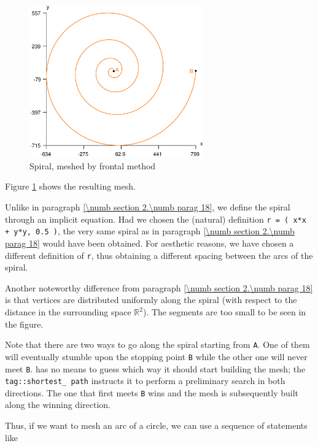 \begin{figure} \centering
 \includegraphics[width=75mm]{spiral-prog}
  \caption{Spiral, meshed by frontal method}
 \label{\numb section 3.\numb fig 3}
\end{figure}

Figure \ref{\numb section 3.\numb fig 3} shows the resulting mesh.

Unlike in paragraph \ref{\numb section 2.\numb parag 18}, we define the spiral through
an implicit equation.
Had we chosen the (natural) definition {\small\tt r =  ( x*x + y*y, 0.5 )},
the very same spiral as in paragraph \ref{\numb section 2.\numb parag 18} would have been
obtained.
For aesthetic reasons, we have chosen a different definition of {\small\tt r}, thus obtaining
a different spacing between the arcs of the spiral.

Another noteworthy difference from paragraph \ref{\numb section 2.\numb parag 18} is that
vertices are distributed uniformly along the spiral (with respect to the distance
in the surrounding space $ \mathbb{R}^2 $).
The segments are too small to be seen in the figure.

Note that there are two ways to go along the spiral starting from {\small\tt A}.
One of them will eventually stumble upon the stopping point {\small\tt B} while
the other one will never meet {\small\tt B}.
{\ManiFEM} has no means to guess which way it should start building the mesh;
the {\small\tt\textcolor{tag}{tag}::shortest\_\,path} instructs it
to perform a preliminary search in both directions.
The one that first meets {\small\tt B} wins and the mesh is subsequently built along
the winning direction.

Thus, if we want to mesh an arc of a circle, we can use a sequence of statements like

